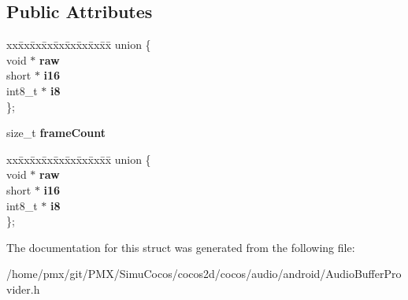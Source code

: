 \subsection*{Public Attributes}
\begin{DoxyCompactItemize}
\item 
\mbox{\label{structcocos2d_1_1experimental_1_1AudioBufferProvider_1_1Buffer_adf88dfa11ba913a69e9fbfa0c115f3c6}} 
\begin{tabbing}
xx\=xx\=xx\=xx\=xx\=xx\=xx\=xx\=xx\=\kill
union \{\\
\>void $\ast$ {\bfseries raw}\\
\>short $\ast$ {\bfseries i16}\\
\>int8\_t $\ast$ {\bfseries i8}\\
\}; \\

\end{tabbing}\item 
\mbox{\label{structcocos2d_1_1experimental_1_1AudioBufferProvider_1_1Buffer_a31130b23afeaa5def875cefb424e9293}} 
size\+\_\+t {\bfseries frame\+Count}
\item 
\mbox{\label{structcocos2d_1_1experimental_1_1AudioBufferProvider_1_1Buffer_a43a10bbe36768b36aa3dab2444f8e387}} 
\begin{tabbing}
xx\=xx\=xx\=xx\=xx\=xx\=xx\=xx\=xx\=\kill
union \{\\
\>void $\ast$ {\bfseries raw}\\
\>short $\ast$ {\bfseries i16}\\
\>int8\_t $\ast$ {\bfseries i8}\\
\}; \\

\end{tabbing}\end{DoxyCompactItemize}


The documentation for this struct was generated from the following file\+:\begin{DoxyCompactItemize}
\item 
/home/pmx/git/\+P\+M\+X/\+Simu\+Cocos/cocos2d/cocos/audio/android/Audio\+Buffer\+Provider.\+h\end{DoxyCompactItemize}
